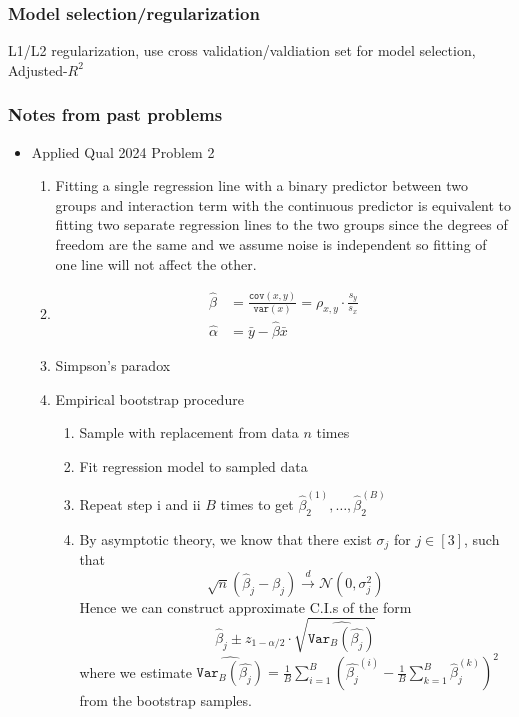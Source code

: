 \documentclass{article}
\begin{document}
\subsubsection{Model selection/regularization}
L1/L2 regularization, use cross validation/valdiation set for model selection, Adjusted-$R^2$
\subsubsection{Notes from past problems}
\begin{itemize}
  \item Applied Qual 2024 Problem 2
    \begin{enumerate}[label=(\alph*)]
      \item Fitting a single regression line with a binary predictor between two groups and interaction term with the continuous predictor
        is equivalent to fitting two separate regression lines to the two groups since the degrees of freedom are the same and we assume noise is independent
        so fitting of one line will not affect the other.
      \item
        \begin{align*}
          \hat{\beta} &= \frac{\mathtt{cov}(x, y)}{\mathtt{var}(x)} = \rho_{x, y} \cdot \frac{s_y}{s_x}\\
          \hat{\alpha} &= \bar{y} - \hat{\beta} \bar{x}
        \end{align*}
      \item Simpson's paradox
      \item Empirical bootstrap procedure
        \begin{enumerate}[label=(\roman*)]
          \item Sample with replacement from data $n$ times
          \item Fit regression model to sampled data
          \item Repeat step i and ii $B$ times to get $\hat{\beta}_2^{(1)}, \ldots, \hat{\beta}_2^{(B)}$
          \item By asymptotic theory, we know that there exist $\sigma_j$ for $j \in [3]$, such that
            \[ \sqrt{n} (\hat{\beta}_j - \beta_j) \xrightarrow{d} \mathcal{N}(0, \sigma^2_j)\]
            Hence we can construct approximate C.I.s of the form
            \[ \hat{\beta}_j \pm z_{1 - \alpha/2} \cdot \sqrt{\widehat{\mathtt{Var}_B(\hat{\beta_j})}} \]
            where we estimate $\widehat{\mathtt{Var}_B(\hat{\beta_j})} = \frac{1}{B} \sum_{i=1}^{B} \left(\hat{\beta_j}^{(i)} - \frac{1}{B} \sum_{k=1}^{B}\hat{\beta}_j^{(k)}\right)^2$ from the bootstrap samples.

\end{enumerate}
\end{enumerate}
\end{itemize}
\end{document}
